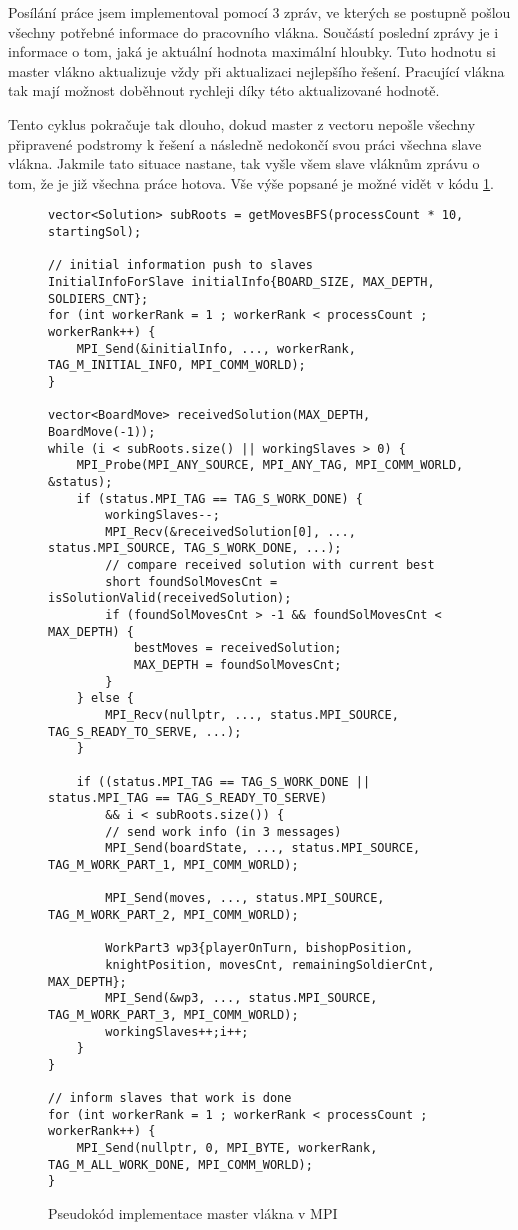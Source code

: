 \documentclass{article} \oddsidemargin=-5mm
\begin{document}
Posílání práce jsem implementoval pomocí 3 zpráv, ve kterých se postupně pošlou všechny potřebné informace do pracovního vlákna. Součástí poslední zprávy je i informace o tom, jaká je aktuální hodnota maximální hloubky. Tuto hodnotu si master vlákno aktualizuje vždy při aktualizaci nejlepšího řešení. Pracující vlákna tak mají možnost doběhnout rychleji díky této aktualizované hodnotě.

Tento cyklus pokračuje tak dlouho, dokud master z vectoru nepošle všechny připravené podstromy k řešení a následně nedokončí svou práci všechna slave vlákna. Jakmile tato situace nastane, tak vyšle všem slave vláknům zprávu o tom, že je již všechna práce hotova. Vše výše popsané je možné vidět v kódu \ref{mpi-master}.

\begin{figure}
\centering
\begin{BVerbatim}
vector<Solution> subRoots = getMovesBFS(processCount * 10, startingSol);

// initial information push to slaves
InitialInfoForSlave initialInfo{BOARD_SIZE, MAX_DEPTH, SOLDIERS_CNT};
for (int workerRank = 1 ; workerRank < processCount ; workerRank++) {
    MPI_Send(&initialInfo, ..., workerRank, TAG_M_INITIAL_INFO, MPI_COMM_WORLD);
}

vector<BoardMove> receivedSolution(MAX_DEPTH, BoardMove(-1));
while (i < subRoots.size() || workingSlaves > 0) {
    MPI_Probe(MPI_ANY_SOURCE, MPI_ANY_TAG, MPI_COMM_WORLD, &status);
    if (status.MPI_TAG == TAG_S_WORK_DONE) {
        workingSlaves--;
        MPI_Recv(&receivedSolution[0], ..., status.MPI_SOURCE, TAG_S_WORK_DONE, ...);
        // compare received solution with current best
        short foundSolMovesCnt = isSolutionValid(receivedSolution);
        if (foundSolMovesCnt > -1 && foundSolMovesCnt < MAX_DEPTH) {
            bestMoves = receivedSolution;
            MAX_DEPTH = foundSolMovesCnt;
        }
    } else {
        MPI_Recv(nullptr, ..., status.MPI_SOURCE, TAG_S_READY_TO_SERVE, ...);
    }

    if ((status.MPI_TAG == TAG_S_WORK_DONE || status.MPI_TAG == TAG_S_READY_TO_SERVE)
        && i < subRoots.size()) {
        // send work info (in 3 messages)
        MPI_Send(boardState, ..., status.MPI_SOURCE, TAG_M_WORK_PART_1, MPI_COMM_WORLD);

        MPI_Send(moves, ..., status.MPI_SOURCE, TAG_M_WORK_PART_2, MPI_COMM_WORLD);

        WorkPart3 wp3{playerOnTurn, bishopPosition,
        knightPosition, movesCnt, remainingSoldierCnt, MAX_DEPTH};
        MPI_Send(&wp3, ..., status.MPI_SOURCE, TAG_M_WORK_PART_3, MPI_COMM_WORLD);
        workingSlaves++;i++;
    }
}

// inform slaves that work is done
for (int workerRank = 1 ; workerRank < processCount ; workerRank++) {
    MPI_Send(nullptr, 0, MPI_BYTE, workerRank, TAG_M_ALL_WORK_DONE, MPI_COMM_WORLD);
}
\end{BVerbatim}
\caption{Pseudokód implementace master vlákna v MPI}
\label{mpi-master}
\end{figure}
\end{document}

